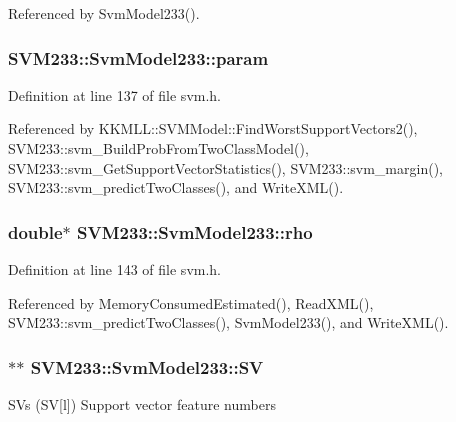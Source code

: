 Referenced by Svm\+Model233().

\subsubsection[{\texorpdfstring{param}{param}}]{ S\+V\+M233\+::\+Svm\+Model233\+::param}\hypertarget{struct_s_v_m233_1_1_svm_model233_aea9d5d416f02777981c7677da2044571}{}\label{struct_s_v_m233_1_1_svm_model233_aea9d5d416f02777981c7677da2044571}


Definition at line 137 of file svm.\+h.



Referenced by K\+K\+M\+L\+L\+::\+S\+V\+M\+Model\+::\+Find\+Worst\+Support\+Vectors2(), S\+V\+M233\+::svm\+\_\+\+Build\+Prob\+From\+Two\+Class\+Model(), S\+V\+M233\+::svm\+\_\+\+Get\+Support\+Vector\+Statistics(), S\+V\+M233\+::svm\+\_\+margin(), S\+V\+M233\+::svm\+\_\+predict\+Two\+Classes(), and Write\+X\+M\+L().

\subsubsection[{\texorpdfstring{rho}{rho}}]{\setlength{\rightskip}{0pt plus 5cm}double$\ast$ S\+V\+M233\+::\+Svm\+Model233\+::rho}\hypertarget{struct_s_v_m233_1_1_svm_model233_abefa926355c127596d8cd576888a0f0c}{}\label{struct_s_v_m233_1_1_svm_model233_abefa926355c127596d8cd576888a0f0c}


Definition at line 143 of file svm.\+h.



Referenced by Memory\+Consumed\+Estimated(), Read\+X\+M\+L(), S\+V\+M233\+::svm\+\_\+predict\+Two\+Classes(), Svm\+Model233(), and Write\+X\+M\+L().

\subsubsection[{\texorpdfstring{SV}{SV}}]{$\ast$$\ast$ S\+V\+M233\+::\+Svm\+Model233\+::\+SV}\hypertarget{struct_s_v_m233_1_1_svm_model233_a97dd1118f0bf7803ad6f4d952a56d06b}{}\label{struct_s_v_m233_1_1_svm_model233_a97dd1118f0bf7803ad6f4d952a56d06b}
S\+Vs (SV\mbox{[}l\mbox{]}) Support vector feature numbers 


